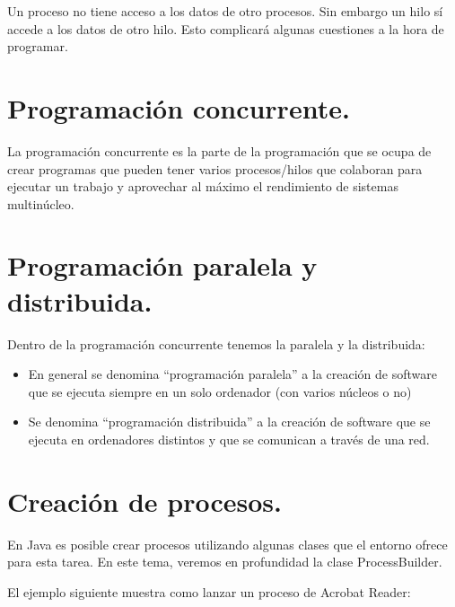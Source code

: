 \documentclass[a4paper,12pt,spanish]{sphinxmanual}
\begin{document}
Un proceso no tiene acceso a los datos de otro procesos. Sin embargo un hilo sí accede a los datos de otro hilo. Esto complicará algunas cuestiones a la hora de programar.


\section{Programación concurrente.}
\label{textos/tema1:programacion-concurrente}
La programación concurrente es la parte de la programación que se ocupa de crear programas que pueden tener varios procesos/hilos que colaboran para ejecutar un trabajo y aprovechar al máximo el rendimiento de sistemas multinúcleo.


\section{Programación paralela y distribuida.}
\label{textos/tema1:programacion-paralela-y-distribuida}
Dentro de la programación concurrente tenemos la paralela y la distribuida:
\begin{itemize}
\item {} 
En general se denomina ``programación paralela'' a la creación de software que se ejecuta siempre en un solo ordenador (con varios núcleos o no)

\item {} 
Se denomina ``programación distribuida'' a la creación de software que se ejecuta en ordenadores distintos y que se comunican a través de una red.

\end{itemize}


\section{Creación de procesos.}
\label{textos/tema1:creacion-de-procesos}
En Java es posible crear procesos utilizando algunas clases que el entorno ofrece para esta tarea. En este tema, veremos en profundidad la clase ProcessBuilder.

El ejemplo siguiente muestra como lanzar un proceso de Acrobat Reader:
\end{document}
